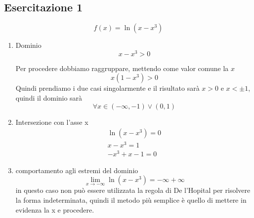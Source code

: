 \subsection{Esercitazione 1}
\begin{equation}
	f(x)=\ln\left(x-x^3\right)
\end{equation}
\begin{enumerate}
	\item Dominio
	\begin{equation*}
		x-x^3>0
	\end{equation*}
	
	Per procedere dobbiamo raggruppare, mettendo come valor comune la $x$
	\begin{equation*}
		x(1-x^3)>0
	\end{equation*}
	Quindi prendiamo i due casi singolarmente e il risultato sarà $x>0$ e $x<\pm1$, quindi il dominio sarà
	\begin{equation*}
		\forall x\in (-\infty,-1) \vee (0,1)
	\end{equation*}
	\item Intersezione con l'asse x
		\begin{equation*}
			\begin{matrix}
				\ln\left(x-x^3\right)=0\\
				x-x^3=1\\
				-x^3+x-1=0
			\end{matrix}
		\end{equation*}
	\item comportamento agli estremi del dominio
		\begin{equation*}
			\lim_{x\to -\infty}\ln\left(x-x^3\right)=-\infty+\infty
		\end{equation*}
		in questo caso non può essere utilizzata la regola di De l'Hopital per risolvere la forma indeterminata, quindi il metodo più semplice è quello di mettere in evidenza la x e procedere.
		

\end{enumerate}
